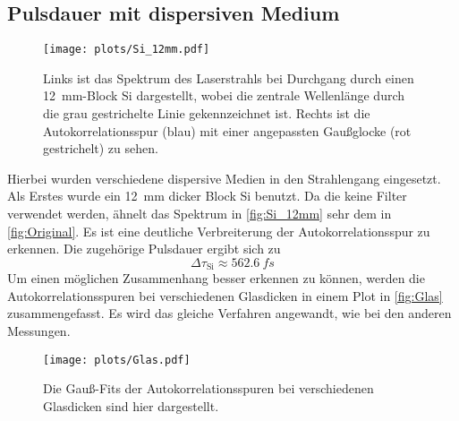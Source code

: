 \subsection{Pulsdauer mit dispersiven Medium}
    \begin{figure}[H]
        \centering\captionsetup{format=plain}\vspace*{-0.5cm}
        \texttt{[image: plots/Si\_12mm.pdf]} \vspace*{-0.5cm}
        \caption{Links ist das Spektrum des Laserstrahls bei Durchgang durch einen \qty{12}{mm}-Block Si dargestellt, wobei die zentrale Wellenlänge durch die grau gestrichelte Linie gekennzeichnet ist. Rechts ist die Autokorrelationsspur (blau) mit einer angepassten Gaußglocke (rot gestrichelt) zu sehen.}
        \label{fig:Si_12mm}
    \end{figure}
    \FloatBarrier
    Hierbei wurden verschiedene dispersive Medien in den Strahlengang eingesetzt.
    Als Erstes wurde ein \qty{12}{mm} dicker Block Si benutzt.
    Da die keine Filter verwendet werden, ähnelt das Spektrum in \autoref{fig:Si_12mm} sehr dem in \autoref{fig:Original}.
    Es ist eine deutliche Verbreiterung der Autokorrelationsspur zu erkennen.
    Die zugehörige Pulsdauer ergibt sich zu
    \begin{equation*}
        \Delta \tau_{\mathrm{Si}} \approx \qty{562,6}{fs}
    \end{equation*}
    Um einen möglichen Zusammenhang besser erkennen zu können, werden die Autokorrelationsspuren bei verschiedenen Glasdicken in einem Plot in \autoref{fig:Glas} zusammengefasst.
    Es wird das gleiche Verfahren angewandt, wie bei den anderen Messungen.
    \begin{figure}[t]
        \centering\captionsetup{format=plain}
        \texttt{[image: plots/Glas.pdf]} \vspace*{-0.5cm}
        \caption{Die Gauß-Fits der Autokorrelationsspuren bei verschiedenen Glasdicken sind hier dargestellt.}
        \label{fig:Glas}
    \end{figure}
    \FloatBarrier

